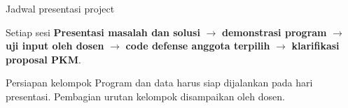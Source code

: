 \documentclass[aspectratio=169,11pt]{beamer}
\begin{document}
\begin{frame}{Jadwal presentasi project}
\begin{center}
\end{center}
\vspace{3mm}
\begin{block}{Setiap sesi}
\small
\textbf{Presentasi masalah dan solusi} $\rightarrow$ \textbf{demonstrasi program} $\rightarrow$ \textbf{uji input oleh dosen} $\rightarrow$ \textbf{code defense anggota terpilih} $\rightarrow$ \textbf{klarifikasi proposal PKM}.
\end{block}
\begin{alertblock}{Persiapan kelompok}
\small
Program dan data harus siap dijalankan pada hari presentasi. Pembagian urutan kelompok disampaikan oleh dosen.
\end{alertblock}
\end{frame}
\end{document}
